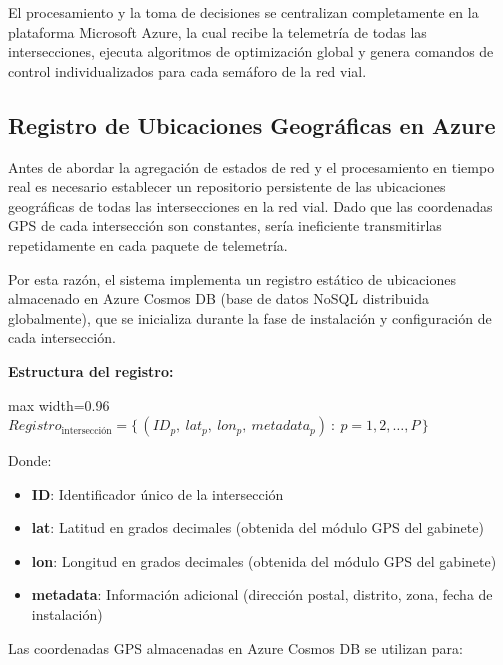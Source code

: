 \documentclass[12pt,a4paper,oneside]{report}
\newenvironment{centeredmath}
  {\begin{center}\begin{adjustbox}{max width=0.96\linewidth}\(\displaystyle}
  {\)\end{adjustbox}\end{center}}
\begin{document}
El procesamiento y la toma de decisiones se centralizan completamente en la plataforma Microsoft Azure, la cual recibe la telemetría de todas las intersecciones, ejecuta algoritmos de optimización global y genera comandos de control individualizados para cada semáforo de la red vial.

\subsection{Registro de Ubicaciones Geográficas en Azure}\label{registro-de-ubicaciones-geogruxe1ficas-en-azure}

Antes de abordar la agregación de estados de red y el procesamiento en tiempo real es necesario establecer un repositorio persistente de las ubicaciones geográficas de todas las intersecciones en la red vial. Dado que las coordenadas GPS de cada intersección son constantes, sería ineficiente transmitirlas repetidamente en cada paquete de telemetría.

Por esta razón, el sistema implementa un registro estático de ubicaciones almacenado en Azure Cosmos DB (base de datos NoSQL distribuida globalmente), que se inicializa durante la fase de instalación y configuración de cada intersección.

\textbf{Estructura del registro:}

\begin{centeredmath}
Registro_{\text{intersección}} = \{\,(ID_{p},\ lat_{p},\ lon_{p},\ metadata_{p})\ :\ p = 1, 2, \ldots, P\,\}
\end{centeredmath}

Donde:

\begin{itemize}
\item
  \textbf{ID}: Identificador único de la intersección
\item
  \textbf{lat}: Latitud en grados decimales (obtenida del módulo GPS del gabinete)
\item
  \textbf{lon}: Longitud en grados decimales (obtenida del módulo GPS del gabinete)
\item
  \textbf{metadata}: Información adicional (dirección postal, distrito, zona, fecha de instalación)
\end{itemize}

Las coordenadas GPS almacenadas en Azure Cosmos DB se utilizan para:
\end{document}

